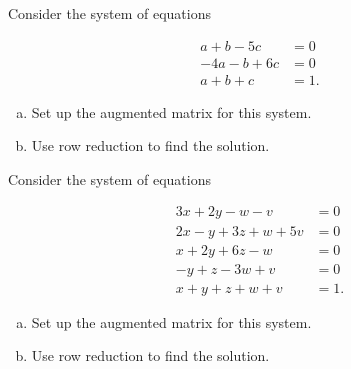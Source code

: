 \begin{xca}
Consider the system of equations 

\[\begin{matrix}
a+b-5c&=0\\-4a-b+6c&=0\\a+b+c&=1.
\end{matrix}\]
\begin{enumerate}[(a)]
\item Set up the augmented matrix for this system.
\item Use row reduction to find the solution.

\end{enumerate}
\end{xca}

\begin{xca}
Consider the system of equations 

\[\begin{matrix}
3x+2y-w-v&=0\\2x-y+3z+w+5v&=0\\x+2y+6z-w&=0\\ -y+z-3w+v&=0\\x+y+z+w+v&=1.
\end{matrix}\]
\begin{enumerate}[(a)]
\item Set up the augmented matrix for this system.
\item Use row reduction to find the solution.

\end{enumerate}
\end{xca}







 